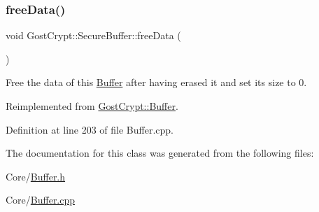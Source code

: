 \subsubsection{\texorpdfstring{free\+Data()}{freeData()}}
{\footnotesize\ttfamily void Gost\+Crypt\+::\+Secure\+Buffer\+::free\+Data (\begin{DoxyParamCaption}{ }\end{DoxyParamCaption})\hspace{0.3cm}{\ttfamily [virtual]}}



Free the data of this \hyperlink{class_gost_crypt_1_1_buffer}{Buffer} after having erased it and set its size to 0. 



Reimplemented from \hyperlink{class_gost_crypt_1_1_buffer_af3b4e8576f58b4eb9bf3b0e819402db9}{Gost\+Crypt\+::\+Buffer}.



Definition at line 203 of file Buffer.\+cpp.



The documentation for this class was generated from the following files\+:\begin{DoxyCompactItemize}
\item 
Core/\hyperlink{_buffer_8h}{Buffer.\+h}\item 
Core/\hyperlink{_buffer_8cpp}{Buffer.\+cpp}\end{DoxyCompactItemize}
